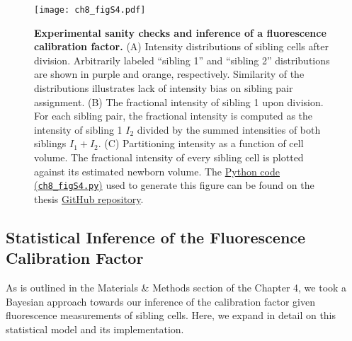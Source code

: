 \documentclass[12pt]{caltech_thesis}
\begin{document}
\hypertarget{fig:sanity_check}{%
\begin{figure}
\centering
\texttt{[image: ch8\_figS4.pdf]}
\caption[{Experimental sanity checks and inference of a fluorescence
calibration factor.}]{\textbf{Experimental sanity checks and inference
of a fluorescence calibration factor.} (A) Intensity distributions of
sibling cells after division. Arbitrarily labeled ``sibling 1'' and
``sibling 2'' distributions are shown in purple and orange,
respectively. Similarity of the distributions illustrates lack of
intensity bias on sibling pair assignment. (B) The fractional intensity
of sibling 1 upon division. For each sibling pair, the fractional
intensity is computed as the intensity of sibling 1 \(I_2\) divided by
the summed intensities of both siblings \(I_1 + I_2\). (C) Partitioning
intensity as a function of cell volume. The fractional intensity of
every sibling cell is plotted against its estimated newborn volume. The
\href{https://github.com/gchure/phd/blob/master/src/chapter_08/code/ch8_figS4.py}{Python
code (\texttt{ch8\_figS4.py})} used to generate this figure can be found
on the thesis \href{https://github.com/gchure/phd}{GitHub repository}.}
\label{fig:sanity_check}
\end{figure}
}

\hypertarget{statistical-inference-of-the-fluorescence-calibration-factor}{%
\subsection{Statistical Inference of the Fluorescence Calibration
Factor}\label{statistical-inference-of-the-fluorescence-calibration-factor}}

As is outlined in the Materials \& Methods section of the Chapter 4, we
took a Bayesian approach towards our inference of the calibration factor
given fluorescence measurements of sibling cells. Here, we expand in
detail on this statistical model and its implementation.
\end{document}
